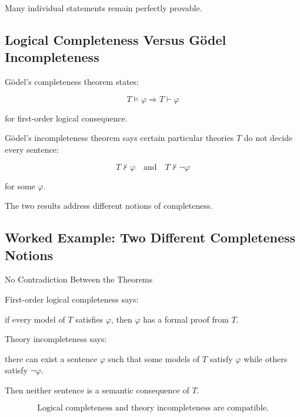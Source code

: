 Many individual statements remain perfectly provable.

\subsection{Logical Completeness Versus Gödel Incompleteness}
\label{subsec:completeness-vs-incompleteness}

Gödel's completeness theorem states:

\[
\boxed{
T\models\varphi
\Longrightarrow
T\vdash\varphi
}
\]

for first-order logical consequence.

Gödel's incompleteness theorem says certain particular theories \(T\) do
not decide every sentence:

\[
\boxed{
T\nvdash\varphi
\quad\text{and}\quad
T\nvdash\neg\varphi
}
\]

for some \(\varphi\).

The two results address different notions of completeness.

\subsection{Worked Example: Two Different Completeness Notions}
\label{subsec:worked-two-completeness-notions}

\begin{workedexamplebox}{No Contradiction Between the Theorems}

First-order logical completeness says:

if every model of \(T\) satisfies \(\varphi\), then \(\varphi\) has a formal
proof from \(T\).

Theory incompleteness says:

there can exist a sentence \(\varphi\) such that some models of \(T\)
satisfy \(\varphi\) while others satisfy \(\neg\varphi\).

Then neither sentence is a semantic consequence of \(T\).

\begin{answerbox}
\[
\boxed{
\text{Logical completeness and theory incompleteness are compatible.}
}
\]
\end{answerbox}

\end{workedexamplebox}

